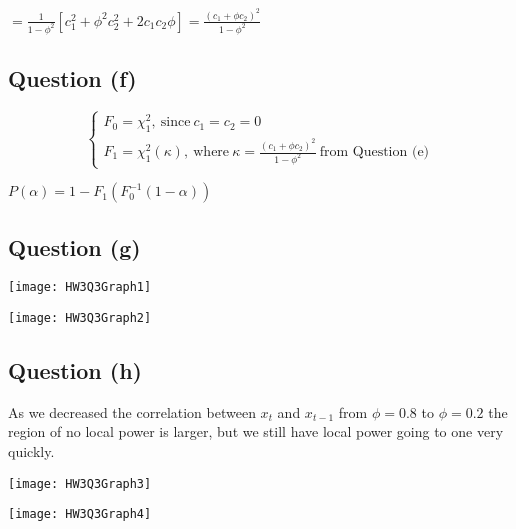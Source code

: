 \documentclass[11pt]{article}
\theoremstyle{definition}
\begin{document}
\hspace{3mm}$=\frac{1}{1-\phi^{2}}\left[c_{1}^{2}+\phi^{2}c_{2}^{2}+2c_{1}c_{2}\phi\right]=\frac{(c_{1}+\phi c_{2})^{2}}{1-\phi^{2}}$

\subsection{Question (f)}
\begin{equation*}
\begin{cases}
F_{0} = \chi_{1}^{2}, \ \text{since} \ c_{1}=c_{2}=0 \\
F_{1} = \chi_{1}^{2}(\kappa), \ \text{where} \ \kappa=\frac{(c_{1}+\phi c_{2})^{2}}{1-\phi^{2}} \ \text{from Question (e)} 
\end{cases}
\end{equation*}

\noindent
$P(\alpha)=1-F_{1}\left(F_{0}^{-1}(1-\alpha)\right)$ \\



\subsection{Question (g)}
\texttt{[image: HW3Q3Graph1]}

\texttt{[image: HW3Q3Graph2]}

\subsection{Question (h)}
As we decreased the correlation between $x_{t}$ and $x_{t-1}$ from $\phi=0.8$ to $\phi=0.2$ the region of no local power is larger, but we still have local power going to one very quickly.

\texttt{[image: HW3Q3Graph3]}

\texttt{[image: HW3Q3Graph4]}
\end{document}

